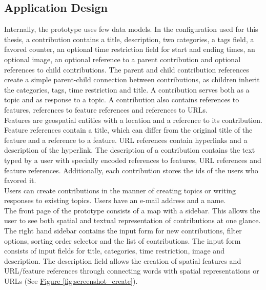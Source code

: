 
\subsection{Application Design} %
\label{sub:design}

Internally, the prototype uses few data models. In the configuration used for this thesis, a contribution contains a title, description, two categories, a tags field, a favored counter, an optional time restriction field for start and ending times, an optional image, an optional reference to a parent contribution and optional references to child contributions. The parent and child contribution references create a simple parent-child connection between contributions, as children inherit the categories, tags, time restriction and title. A contribution serves both as a topic and as response to a topic. A contribution also contains references to features, references to feature references and references to URLs.\\
Features are geospatial entities with a location and a reference to its contribution.\\
Feature references contain a title, which can differ from the original title of the feature and a reference to a feature. URL references contain hyperlinks and a description of the hyperlink. The description of a contribution contains the text typed by a user with specially encoded references to features, URL references and feature references. Additionally, each contribution stores the ids of the users who favored it.\\
Users can create contributions in the manner of creating topics or writing responses to existing topics. Users have an e-mail address and a name. \\
The front page of the prototype consists of a map with a sidebar. This allows the user to see both spatial and textual representation of contributions at one glance. The right hand sidebar contains the input form for new contributions, filter options, sorting order selector and the list of contributions. The input form consists of input fields for title, categories, time restriction, image and description. The description field allows the creation of spatial features and URL/feature references through connecting words with spatial representations or URLs (See \hyperref[fig:screenshot_create]{Figure \ref{fig:screenshot_create}}). \\
